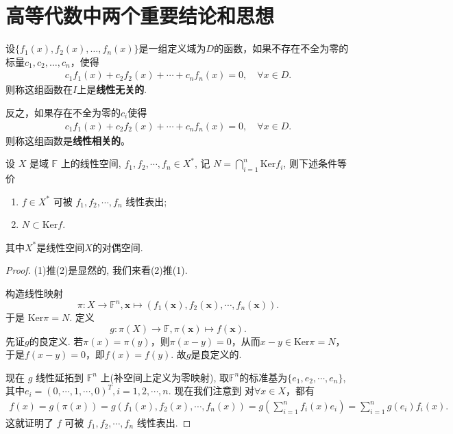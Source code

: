\documentclass[../../main.tex]{subfiles}%
\begin{document}
\section{高等代数中两个重要结论和思想}

\begin{definition}[函数组线性无关/相关]
设\(\{f_1(x), f_2(x), \ldots, f_n(x)\}\)是一组定义域为$D$的函数，如果不存在不全为零的标量\(c_1, c_2, \ldots, c_n\)，使得 
\begin{align*}
c_1 f_1(x) + c_2 f_2(x) + \cdots + c_n f_n(x) = 0,\quad \forall x\in D.
\end{align*}
则称这组函数在\(I\)上是\textbf{线性无关的}.

反之，如果存在不全为零的\(c_i\)使得
\begin{align*}
c_1 f_1(x) + c_2 f_2(x) + \cdots + c_n f_n(x) = 0,\quad \forall x\in D.
\end{align*}
则称这组函数是\textbf{线性相关的}。
\end{definition}

\begin{theorem}\label{theorem:高等代数的重要结论1}
设 \( X \) 是域 \( \mathbb{F} \) 上的线性空间, \( f_1, f_2, \cdots, f_n \in X^* \), 记 \( N = \bigcap_{i=1}^n \mathrm{Ker} f_i \), 则下述条件等价
\begin{enumerate}[(1)]
\item \( f \in X^* \) 可被 \( f_1, f_2, \cdots, f_n \) 线性表出;

\item \( N \subset \mathrm{Ker} f \).
\end{enumerate}
其中$X^*$是线性空间$X$的对偶空间.
\end{theorem}
\begin{proof}

(1)推(2)是显然的, 我们来看(2)推(1).

构造线性映射
\[
\pi: X \to \mathbb{F}^n, \mathbf{x} \mapsto (f_1(\mathbf{x}), f_2(\mathbf{x}), \cdots, f_n(\mathbf{x})).
\]
于是 \( \mathrm{Ker} \pi = N \). 定义
\[
g: \pi(X) \to \mathbb{F}, \pi(\mathbf{x}) \mapsto f(\mathbf{x}).
\]
先证$g$的良定义. 若$\pi(x) = \pi(y)$，则$\pi(x - y) = 0$，从而$x - y \in \mathrm{Ker} \pi = N$，于是$f(x - y) = 0$，即$f(x) = f(y)$. 故$g$是良定义的.

现在 \( g \) 线性延拓到 \( \mathbb{F}^n \) 上(补空间上定义为零映射), 取$\mathbb{F}^n$的标准基为$\{e_1,e_2,\cdots,e_n\}$,其中$e_i=(0,\cdots,1,\cdots,0)^T,i=1,2,\cdots,n$.
现在我们注意到
对$\forall x \in X$，都有
\begin{align*}
f(x) = g(\pi(x)) = g(f_1(x), f_2(x), \cdots, f_n(x)) = g\left( \sum_{i=1}^n f_i(x) e_i \right) = \sum_{i=1}^n g(e_i) f_i(x).
\end{align*}
这就证明了 \( f \) 可被 \( f_1, f_2, \cdots, f_n \) 线性表出.

\end{proof}
\end{document}
